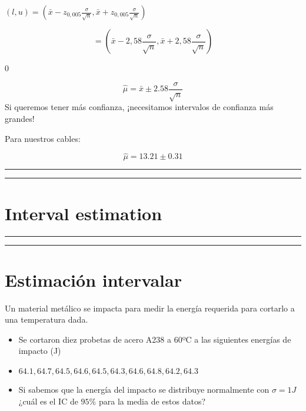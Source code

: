 \documentclass[
]{book}
\begin{document}
\((l,u) = (\bar{x} - z_{0,005}\frac{\sigma}{\sqrt{n}},\bar{x} + z_{0,005}\frac{\sigma}{\sqrt{n}})\)

\[= (\bar{x} - 2,58\frac{\sigma}{\sqrt{n}},\bar{x} + 2,58\frac{\sigma}{\sqrt{n}})\]

0

\[\hat{\mu}=\bar{x} \pm 2.58\frac{\sigma}{\sqrt{n}}\]
Si queremos tener más confianza, ¡necesitamos intervalos de confianza más grandes!

Para nuestros cables:

\[\hat{\mu}= 13.21 \pm 0.31\]

\begin{center}\rule{0.5\linewidth}{0.5pt}\end{center}

\begin{center}\rule{0.5\linewidth}{0.5pt}\end{center}

\hypertarget{interval-estimation}{%
\section{Interval estimation}\label{interval-estimation}}

\begin{center}\rule{0.5\linewidth}{0.5pt}\end{center}

\begin{center}\rule{0.5\linewidth}{0.5pt}\end{center}

\hypertarget{estimaciuxf3n-intervalar-6}{%
\section{Estimación intervalar}\label{estimaciuxf3n-intervalar-6}}

Un material metálico se impacta para medir la energía requerida para cortarlo a una temperatura dada.

\begin{itemize}
\item
  Se cortaron diez probetas de acero A238 a 60ºC a las siguientes energías de impacto (J)
\item
  \(64.1, 64.7, 64.5, 64.6, 64.5, 64.3, 64.6, 64.8, 64.2, 64.3\)
\item
  Si sabemos que la energía del impacto se distribuye normalmente con \(\sigma=1J\) ¿cuál es el IC de \(95\%\) para la media de estos datos?
\end{itemize}
\end{document}
